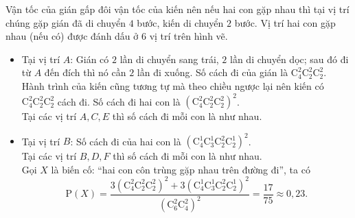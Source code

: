 \begin{ex}
{{
		}
		Vận tốc của gián gấp đôi vận tốc của kiến nên nếu hai con gặp nhau thì tại vị trí chúng gặp gián đã di chuyển $4$ bước, kiến di chuyển $2$ bước. Vị trí hai con gặp nhau (nếu có) được đánh dấu ở $6$ vị trí trên hình vẽ.
		\begin{itemize}
			\item Tại vị trí $A$: Gián có $2$ lần di chuyển sang trái, $2$ lần di chuyển dọc; sau đó đi từ $A$ đến đích thì nó cần $2$ lần đi xuống. Số cách đi của gián là $\mathrm{C}^2_4\mathrm{C}^2_2\mathrm{C}^2_2$. Hành trình của kiến cũng tương tự mà theo chiều ngược lại nên kiến có $\mathrm{C}^2_4\mathrm{C}^2_2\mathrm{C}^2_2$ cách đi. Số cách đi hai con là ${\left(\mathrm{C}^2_4\mathrm{C}^2_2\mathrm{C}^2_2\right)}^2$.\\
			Tại các vị trí ${A}, {C}, {E}$ thì số cách đi mỗi con là như nhau.
			\item Tại vị trí $B$: Số cách đi của hai con là ${\left(\mathrm{C}^1_4\mathrm{C}^1_3\mathrm{C}^2_2\mathrm{C}^1_2\right)}^2$.\\
			Tại các vị trí ${B},{D},{F}$ thì số cách đi mỗi con là như nhau.\\
			Gọi $X$ là biến cố: “hai con côn trùng gặp nhau trên đường đi”, ta có
			\[\mathrm{P}(X)=\dfrac{3{\left(\mathrm{C}^2_4\mathrm{C}^2_2\mathrm{C}^2_2\right)}^2+3{\left(\mathrm{C}^1_4\mathrm{C}^1_3\mathrm{C}^2_2\mathrm{C}^1_2\right)}^2}{{\left(\mathrm{C}^2_6\mathrm{C}^2_4\right)}^2}=\dfrac{17}{75}\approx 0{,}23.\]
		\end{itemize}
	}
\end{ex}

